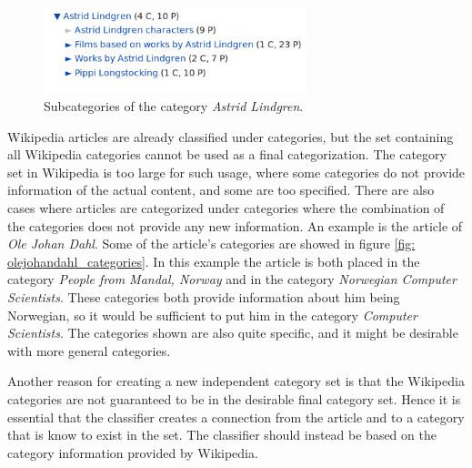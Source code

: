 
\begin{figure}[H]
\centering
\includegraphics[height=2.5cm]{Chapters/Background/Astrid_Lindgren}
\caption{Subcategories of the category \emph{Astrid Lindgren}. }
\label{fig: subcat_lindgren}
\end{figure}

Wikipedia articles are already classified under categories, but the set containing all Wikipedia categories cannot be used as a final categorization. The category set in Wikipedia is too large for such usage, where some categories do not provide information of the actual content, and some are too specified. There are also cases where articles are categorized under categories where the combination of the categories does not provide any new information. An example is the article of \emph{Ole Johan Dahl}. Some of the article's categories are showed in figure \ref{fig: olejohandahl_categories}. In this example the article is both placed in the category \emph{People from Mandal, Norway} and in the category \emph{Norwegian Computer Scientists}. These categories both provide information about him being Norwegian, so it would be sufficient to put him in the category \emph{Computer Scientists}. The categories shown are also quite specific, and it might be desirable with more general categories. 





Another reason for creating a new independent category set is that the Wikipedia categories are not guaranteed to be in the desirable final category set. Hence it is essential that the classifier creates a connection from the article and to a category that is know to exist in the set. The classifier should instead be based on the category information provided by Wikipedia. 

